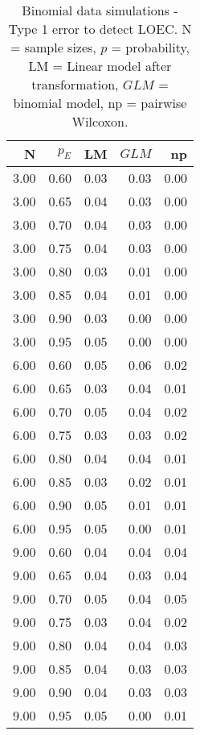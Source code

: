 \begin{table}
\centering
\caption[Binomial data simulations - Type 1 error to detect LOEC.]{Binomial data simulations - Type 1 error to detect LOEC. N = sample sizes, 
             $p$ = probability, LM = Linear model after transformation, 
             $GLM$ = binomial model, np = pairwise Wilcoxon.} 
\label{tab:t1_loec_p}
{\footnotesize
\begin{tabular}{rrrrr}
  \hline
N & $p_E$ & LM & $GLM$ & np \\ 
  \hline
3.00 & 0.60 & 0.03 & 0.03 & 0.00 \\ 
  3.00 & 0.65 & 0.04 & 0.03 & 0.00 \\ 
  3.00 & 0.70 & 0.04 & 0.03 & 0.00 \\ 
  3.00 & 0.75 & 0.04 & 0.03 & 0.00 \\ 
  3.00 & 0.80 & 0.03 & 0.01 & 0.00 \\ 
  3.00 & 0.85 & 0.04 & 0.01 & 0.00 \\ 
  3.00 & 0.90 & 0.03 & 0.00 & 0.00 \\ 
  3.00 & 0.95 & 0.05 & 0.00 & 0.00 \\ 
  6.00 & 0.60 & 0.05 & 0.06 & 0.02 \\ 
  6.00 & 0.65 & 0.03 & 0.04 & 0.01 \\ 
  6.00 & 0.70 & 0.05 & 0.04 & 0.02 \\ 
  6.00 & 0.75 & 0.03 & 0.03 & 0.02 \\ 
  6.00 & 0.80 & 0.04 & 0.04 & 0.01 \\ 
  6.00 & 0.85 & 0.03 & 0.02 & 0.01 \\ 
  6.00 & 0.90 & 0.05 & 0.01 & 0.01 \\ 
  6.00 & 0.95 & 0.05 & 0.00 & 0.01 \\ 
  9.00 & 0.60 & 0.04 & 0.04 & 0.04 \\ 
  9.00 & 0.65 & 0.04 & 0.03 & 0.04 \\ 
  9.00 & 0.70 & 0.05 & 0.04 & 0.05 \\ 
  9.00 & 0.75 & 0.03 & 0.04 & 0.02 \\ 
  9.00 & 0.80 & 0.04 & 0.04 & 0.03 \\ 
  9.00 & 0.85 & 0.04 & 0.03 & 0.03 \\ 
  9.00 & 0.90 & 0.04 & 0.03 & 0.03 \\ 
  9.00 & 0.95 & 0.05 & 0.00 & 0.01 \\ 
   \hline
\end{tabular}
}
\end{table}
